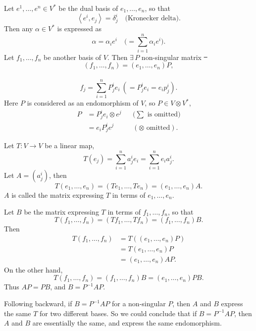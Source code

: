\documentclass[12pt]{article}
\begin{document}
Let \(e^1,\ldots,e^n\in V^*\) be the dual basis of \(e_1,\ldots,e_n\), so that \[
    \left<e^i,e_j\right> =\delta_j^i\quad\text{(Kronecker delta)}
.\] Then any \(\alpha\in V^*\) is expressed as \[
    \alpha=\alpha_i e^i\quad \Big(=\sum_{i=1}^{n}\alpha_i e^i\Big)
.\] Let \(f_1,\ldots,f_n\) be another basis of \(V\). Then \(\exists\,P\) non-singular
matrix \st\ \[
    (f_1,\ldots,f_n)=(e_1,\ldots,e_n)P
,\] \ie\ \[
    f_j=\sum_{i=1}^{n}P_j^i e_i\ \left(=P_j^i e_i=e_i p^i_j\right)
.\] Here \(P\) is considered as an endomorphism of \(V\), so \(P\in V\otimes V^*\),
\begin{align*}
    P&=P_j^i e_i\otimes e^j &&\Big(\sum\text{ is omitted}\Big) \\
    &=e_i P_j^i e^j &&(\otimes \text{ omitted})
.\end{align*}

Let \(T\colon V\to V\) be a linear map, \[
    T(e_j)=\sum_{i=1}^{n}a_j^i e_i=\sum_{i=1}^{n}e_i a_j^i
.\] Let \(A=(a_j^i)\), then \[
    T(e_1,\ldots,e_n)=(Te_1,\ldots,Te_n)=(e_1,\ldots,e_n)A
.\] \(A\) is called the matrix expressing \(T\) in terms of \(e_1,\ldots,e_n\). 

Let \(B\) be the matrix expressing \(T\) in terms of \(f_1,\ldots,f_n\), so that \[
    T(f_1,\ldots,f_n)=(Tf_1,\ldots,Tf_n)=(f_1,\ldots,f_n)B
.\] Then 
\begin{align*}
    T(f_1,\ldots,f_n)&=T((e_1,\ldots,e_n)P) \\
    &=T(e_1,\ldots,e_n)P \\
    &=(e_1,\ldots,e_n)AP
.\end{align*}
On the other hand, \[
    T(f_1,\ldots,f_n)=(f_1,\ldots,f_n)B=(e_1,\ldots,e_n)PB
.\] Thus \(AP=PB\), and \(\boxed{B=P^{-1}AP}\).

Following backward, if \(B=P^{-1}AP\) for a non-singular \(P\), then \(A\) and \(B\)
express the same \(T\) for two different bases. So we could conclude that if
\(B=P^{-1}AP\), then \(A\) and \(B\) are essentially the same, and express the same
endomorphism.
\end{document}
